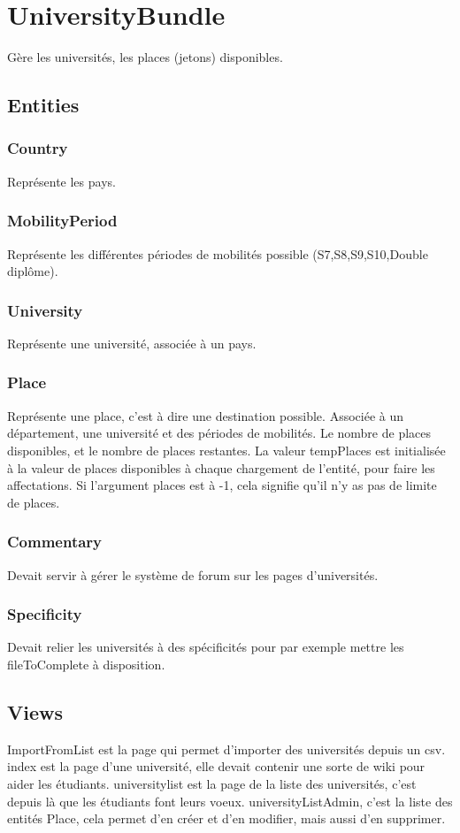 \section{UniversityBundle}
Gère les universités, les places (jetons) disponibles.
\subsection{Entities}
\subsubsection{Country}
Représente les pays.

\subsubsection{MobilityPeriod}
Représente les différentes périodes de mobilités possible (S7,S8,S9,S10,Double diplôme).

\subsubsection{University}
Représente une université, associée à un pays.

\subsubsection{Place}
Représente une place, c'est à dire une destination possible. Associée à un département, une université et des périodes de mobilités. Le nombre de places disponibles, et le nombre de places restantes. La valeur tempPlaces est initialisée à la valeur de places disponibles à chaque chargement de l'entité, pour faire les affectations.
Si l'argument places est à -1, cela signifie qu'il n'y as pas de limite de places.


\subsubsection{Commentary}
Devait servir à gérer le système de forum sur les pages d'universités.

\subsubsection{Specificity}
Devait relier les universités à des spécificités pour par exemple mettre les fileToComplete à disposition.

\subsection{Views}
ImportFromList est la page qui permet d'importer des universités depuis un csv.
index est la page d'une université, elle devait contenir une sorte de wiki pour aider les étudiants.
universitylist est la page de la liste des universités, c'est depuis là que les étudiants font leurs voeux.
universityListAdmin, c'est la liste des entités Place, cela permet d'en créer et d'en modifier, mais aussi d'en supprimer.


